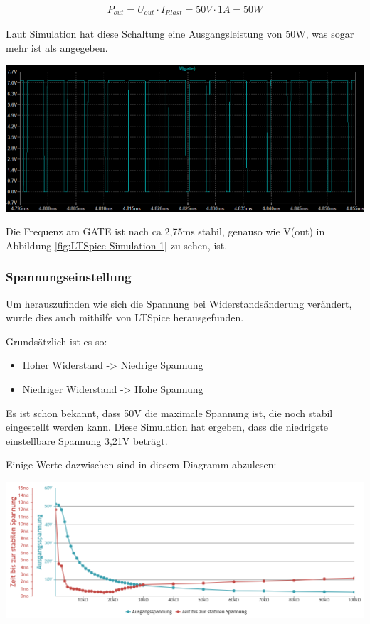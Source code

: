 \documentclass[paper=a4, 12pt]{scrreprt}
\begin{document}
			\begin{align*} 
			P_{out} = U_{out} \cdot I_{Rlast} = 50V \cdot 1A = 50W
			\end{align*} 
			
			Laut Simulation hat diese Schaltung eine Ausgangsleistung von 50W, was sogar mehr ist als angegeben. 
			\begin{adjustbox}{center,caption={Stabile Gate Spannung des MOSFETs},label={fig:LTSpice-Simulation-2},nofloat=figure,vspace=\bigskipamount}
				\includegraphics[width=\textwidth]{img/LTSpice_Simulation_2.PNG}
			\end{adjustbox}
			
			Die Frequenz am GATE ist nach ca 2,75ms stabil, genauso wie V(out) in Abbildung \ref{fig:LTSpice-Simulation-1} zu sehen, ist. 
			
			\subsubsection{Spannungseinstellung}\hfill \break
			Um herauszufinden wie sich die Spannung bei Widerstandsänderung verändert, wurde dies auch mithilfe von LTSpice herausgefunden.
			
			Grundsätzlich ist es so:
			\begin{itemize}
				\item Hoher Widerstand -> Niedrige Spannung
				\item Niedriger Widerstand -> Hohe Spannung
			\end{itemize}
			
			Es ist schon bekannt, dass 50V die maximale Spannung ist, die noch stabil eingestellt werden kann. Diese Simulation hat ergeben, dass die niedrigste einstellbare Spannung 3,21V beträgt.
			
			Einige Werte dazwischen sind in diesem Diagramm abzulesen:
			\begin{adjustbox}{center,caption={Spannungsverlauf bei Widerstandsänderung},label={fig:spgVLbWdst},nofloat=figure,vspace=\bigskipamount}
				\includegraphics[width=\textwidth]{img/simulationSPG.PNG}
			\end{adjustbox}
		
\end{document}
